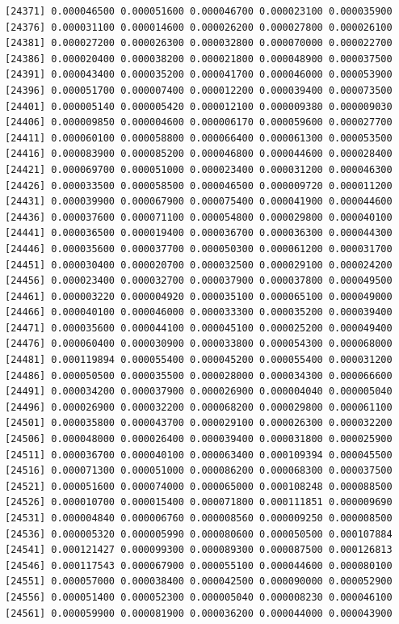 \documentclass[]{article}
\begin{document}
\begin{verbatim}
[24371] 0.000046500 0.000051600 0.000046700 0.000023100 0.000035900
[24376] 0.000031100 0.000014600 0.000026200 0.000027800 0.000026100
[24381] 0.000027200 0.000026300 0.000032800 0.000070000 0.000022700
[24386] 0.000020400 0.000038200 0.000021800 0.000048900 0.000037500
[24391] 0.000043400 0.000035200 0.000041700 0.000046000 0.000053900
[24396] 0.000051700 0.000007400 0.000012200 0.000039400 0.000073500
[24401] 0.000005140 0.000005420 0.000012100 0.000009380 0.000009030
[24406] 0.000009850 0.000004600 0.000006170 0.000059600 0.000027700
[24411] 0.000060100 0.000058800 0.000066400 0.000061300 0.000053500
[24416] 0.000083900 0.000085200 0.000046800 0.000044600 0.000028400
[24421] 0.000069700 0.000051000 0.000023400 0.000031200 0.000046300
[24426] 0.000033500 0.000058500 0.000046500 0.000009720 0.000011200
[24431] 0.000039900 0.000067900 0.000075400 0.000041900 0.000044600
[24436] 0.000037600 0.000071100 0.000054800 0.000029800 0.000040100
[24441] 0.000036500 0.000019400 0.000036700 0.000036300 0.000044300
[24446] 0.000035600 0.000037700 0.000050300 0.000061200 0.000031700
[24451] 0.000030400 0.000020700 0.000032500 0.000029100 0.000024200
[24456] 0.000023400 0.000032700 0.000037900 0.000037800 0.000049500
[24461] 0.000003220 0.000004920 0.000035100 0.000065100 0.000049000
[24466] 0.000040100 0.000046000 0.000033300 0.000035200 0.000039400
[24471] 0.000035600 0.000044100 0.000045100 0.000025200 0.000049400
[24476] 0.000060400 0.000030900 0.000033800 0.000054300 0.000068000
[24481] 0.000119894 0.000055400 0.000045200 0.000055400 0.000031200
[24486] 0.000050500 0.000035500 0.000028000 0.000034300 0.000066600
[24491] 0.000034200 0.000037900 0.000026900 0.000004040 0.000005040
[24496] 0.000026900 0.000032200 0.000068200 0.000029800 0.000061100
[24501] 0.000035800 0.000043700 0.000029100 0.000026300 0.000032200
[24506] 0.000048000 0.000026400 0.000039400 0.000031800 0.000025900
[24511] 0.000036700 0.000040100 0.000063400 0.000109394 0.000045500
[24516] 0.000071300 0.000051000 0.000086200 0.000068300 0.000037500
[24521] 0.000051600 0.000074000 0.000065000 0.000108248 0.000088500
[24526] 0.000010700 0.000015400 0.000071800 0.000111851 0.000009690
[24531] 0.000004840 0.000006760 0.000008560 0.000009250 0.000008500
[24536] 0.000005320 0.000005990 0.000080600 0.000050500 0.000107884
[24541] 0.000121427 0.000099300 0.000089300 0.000087500 0.000126813
[24546] 0.000117543 0.000067900 0.000055100 0.000044600 0.000080100
[24551] 0.000057000 0.000038400 0.000042500 0.000090000 0.000052900
[24556] 0.000051400 0.000052300 0.000005040 0.000008230 0.000046100
[24561] 0.000059900 0.000081900 0.000036200 0.000044000 0.000043900

\end{verbatim}
\end{document}
